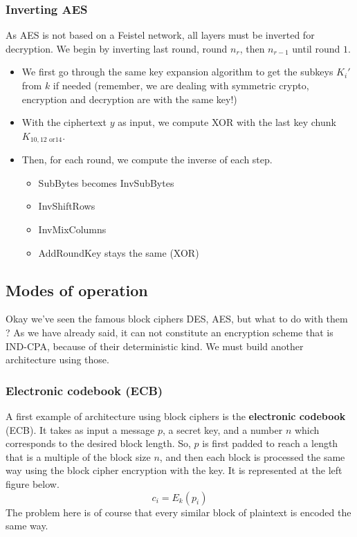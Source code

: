\documentclass[../Cryptography.tex]{subfiles}
\begin{document}
\subsubsection{Inverting AES}
As AES is not based on a Feistel network, all layers must be inverted for decryption. We begin by inverting last round, round $n_r$, then $n_{r-1}$ until round $1$.
\begin{itemize}
    \item We first go through the same key expansion algorithm to get the subkeys $K_i '$ from $k$ if needed (remember, we are dealing with symmetric crypto, encryption and decryption are with the same key!)
    \item With the ciphertext $y$ as input, we compute XOR with the last key chunk $K_{10, 12\text{ or} 14}$.
    \item Then, for each round, we compute the inverse of each step.
    \begin{itemize}
        \item SubBytes becomes InvSubBytes
        \item InvShiftRows
        \item InvMixColumns
        \item AddRoundKey stays the same (XOR)
    \end{itemize}
\end{itemize}
\subsection{Modes of operation}
Okay we've seen the famous block ciphers DES, AES, but what to do with them ? As we have already said, it can not constitute an encryption scheme that is IND-CPA, because of their deterministic kind. We must build another architecture using those. \\

\subsubsection{Electronic codebook (ECB)}
A first example of architecture using block ciphers is the \textbf{electronic codebook} (ECB). It takes as input a message $p$, a secret key, and a number $n$ which corresponds to the desired block length. So, $p$ is first padded to reach a length that is a multiple of the block size $n$, and then each block is processed the same way using the block cipher encryption with the key. It is represented at the left figure below. \\
$$c_i = E_k(p_i)$$
The problem here is of course that every similar block of plaintext is encoded the same way.
\end{document}
